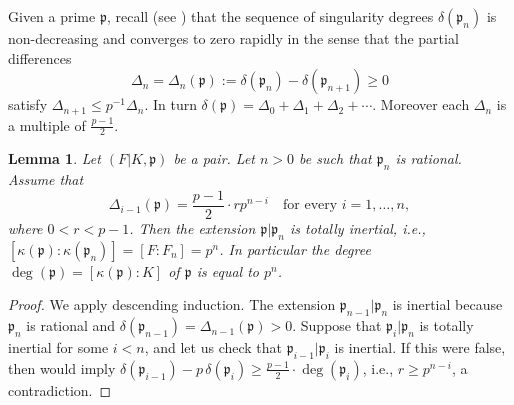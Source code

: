 \documentclass[12pt,reqno]{amsart}%
\newtheorem{lem}[prop]{Lemma}
\theoremstyle{definition}
\theoremstyle{remark}
\newcommand{\pp}{\mathfrak{p}}
\newcommand{\de}{\delta}
\newcommand{\De}{\Delta}
\newcommand{\ka}{\kappa}
\begin{document}
Given a prime $\pp$, recall (see \cite[pp.\,284-285]{HiSt22}) that the sequence of singularity degrees $\de(\pp_n)$ is non-decreasing and converges to zero rapidly in the sense that the partial differences
\[\De_n = \De_n(\pp) := \de(\pp_n) - \de(\pp_{n+1}) \geq 0 \]
satisfy $\De_{n+1} \leq p^{-1} \De_n$. In turn $\de(\pp) = \De_0 + \De_1 + \De_2 + \cdots$.
Moreover each $\De_n$ is a multiple of $\frac{p-1}2$.

\begin{lem} \label{2022_07_24_00:30}
Let $(F|K,\pp)$ be a pair.
Let $n > 0$ be such that $\pp_{n}$ is rational.
Assume that
\[ \De_{i-1}(\pp) = \frac{p-1}{2} \cdot r p^{n-i} \quad \text{for every $i=1,\dots,n$},  \]
where $0 < r < p-1$.
Then the extension $\pp|\pp_n$ is totally inertial, i.e., $[\ka(\pp):\ka(\pp_n)] = [F:F_n] = p^n$.
In particular the degree $\deg(\pp) = [\ka(\pp):K]$ of $\pp$ is equal to $p^{n}$.
\end{lem}

\begin{proof}
We apply descending induction.
The extension $\pp_{n-1}|\pp_n$ is inertial
because $\pp_{n}$ is rational and $\de(\pp_{n-1}) = \De_{n-1}(\pp) > 0$.
Suppose that $\pp_{i}|\pp_n$ is totally inertial for some $i<n$, 
and let us check that $\pp_{i-1}|\pp_i$ is inertial.
If this were false, %
then \cite[Lemma~3.2]{HiSt23} would imply $\de(\pp_{i-1}) - p \, \de(\pp_{i}) \geq \frac{p-1}2 \cdot \deg(\pp_{i})$, i.e., $r \geq p^{n-i}$, a contradiction.
\end{proof}
\end{document}
